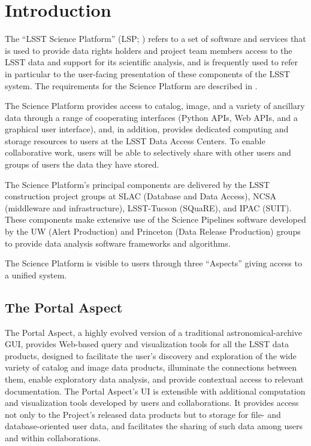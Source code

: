 \section{Introduction}\label{introduction}

The ``LSST Science Platform'' (LSP; ) refers to a set of software and services that is used to provide data rights holders and project team members access to the LSST data and support for its scientific analysis, and is frequently used to refer in particular to the user-facing presentation of these components of the LSST system.
The requirements for the Science Platform are described in .

The Science Platform provides access to catalog, image, and a variety of ancillary data through a range of cooperating interfaces (Python APIs, Web APIs, and a graphical user interface),
and, in addition, provides dedicated computing and storage resources to users at the LSST Data Access Centers.
To enable collaborative work, users will be able to selectively share with other users and groups of users the data they have stored.

The Science Platform's principal components are delivered by the LSST construction project groups at SLAC (Database and Data Access), NCSA (middleware and infrastructure), LSST-Tucson (SQuaRE), and IPAC (SUIT).  These components make extensive use of the Science Pipelines software developed by the UW (Alert Production) and Princeton (Data Release Production) groups to provide data analysis software frameworks and algorithms.

The Science Platform is visible to users through three ``Aspects'' giving access to a unified system.


\subsection{The Portal Aspect}\label{portal-aspect-intro}

The Portal Aspect, a highly evolved version of a traditional astronomical-archive GUI, provides Web-based query and visualization tools for all the LSST data products, designed to facilitate the user's discovery and exploration of the wide variety of catalog and image data products, illuminate the connections between them, enable exploratory data analysis, and provide contextual access to relevant documentation.
The Portal Aspect's UI is extensible with additional computation and visualization tools developed by users and collaborations.
It provides access not only to the Project's released data products but to storage for file- and database-oriented user data, and facilitates the sharing of such data among users and within collaborations.

